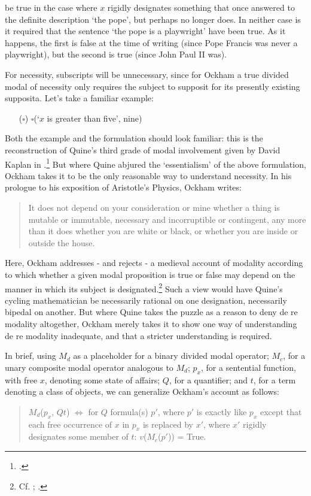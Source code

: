 	\noindent be true in the case where $x$ rigidly designates something that once answered to the definite description `the pope', but perhaps no longer does. In neither case is it required that the sentence `the pope is a playwright' have been true. As it happens, the first is false at the time of writing (since Pope Francis was never a playwright), but the second is true (since John Paul II was).
	
	For necessity, subscripts will be unnecessary, since for Ockham a true divided modal of necessity only requires the subject to supposit for its presently existing supposita. Let's take a familiar example:
	\begin{enumerate}
		\item[($\square$)] $\square$(`$x$ is greater than five', nine)
	\end{enumerate}
	
	Both the example and the formulation should look familiar: this is the reconstruction of Quine's third grade of modal involvement given by David Kaplan in \cite{Kaplan1968}.\footnote{\cite{Quine1976}.} But where Quine abjured the `essentialism' of the above formulation, Ockham takes it to be the only reasonable way to understand necessity. In his prologue to his exposition of Aristotle's Physics, Ockham writes: 
	
	\begin{quote}
		It does not depend on your consideration or mine whether a thing is mutable or immutable, necessary and incorruptible or contingent, any more than it does whether you are white or black, or whether you are inside or outside the house. \cite[p. 14, alt.]{Ockham1957}
	\end{quote}
	
	\noindent Here, Ockham addresses - and rejects - a medieval account of modality according to which whether a given modal proposition is true or false may depend on the manner in which its subject is designated.\footnote{Cf. \cite[ch. 3, 12]{Anselm1974}; \cite[ch. 12]{AquinasDF}.} Such a view would have Quine's cycling mathematician be necessarily rational on one designation, necessarily bipedal on another. But where Quine takes the puzzle as a reason to deny de re modality altogether, Ockham merely takes it to show one way of understanding de re modality inadequate, and that a stricter understanding is required.
	
	In brief, using $M_{d}$ as a placeholder for a binary divided modal operator; $M_{c}$, for a unary composite modal operator analogous to $M_{d}$; $p_{x}$, for a sentential function, with free $x$, denoting some state of affairs; $Q$, for a quantifier; and $t$, for a term denoting a class of objects, we can generalize Ockham's account as follows:
	\begin{quote}
		$M_{d}$($p_{x}$, $Qt$) $\Leftrightarrow$ for $Q$ formula(s) $p'$, where  $p'$ is exactly like $p_{x}$ except that each free occurrence of $x$ in $p_{x}$ is replaced by $x'$, where $x'$ rigidly designates some member of $t$: $v$($M_{c}$($p'$)) = True.
	\end{quote}
	
